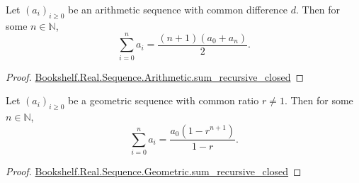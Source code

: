 \documentclass{article}
\begin{document}
\begin{theorem}

  Let $(a_i)_{i \geq 0}$ be an arithmetic sequence with common difference $d$.
  Then for some $n \in \mathbb{N}$,
  $$\sum_{i=0}^n a_i = \frac{(n + 1)(a_0 + a_n)}{2}.$$

\end{theorem}

\begin{proof}

  \href{Sequence/Arithmetic.lean}{Bookshelf.Real.Sequence.Arithmetic.sum_recursive_closed}

\end{proof}

\begin{theorem}

  Let $(a_i)_{i \geq 0}$ be a geometric sequence with common ratio $r \neq 1$.
  Then for some $n \in \mathbb{N}$,
  $$\sum_{i=0}^n a_i = \frac{a_0(1 - r^{n+1})}{1 - r}.$$

\end{theorem}

\begin{proof}

  \href{Sequence/Geometric.lean}{Bookshelf.Real.Sequence.Geometric.sum_recursive_closed}

\end{proof}
\end{document}
